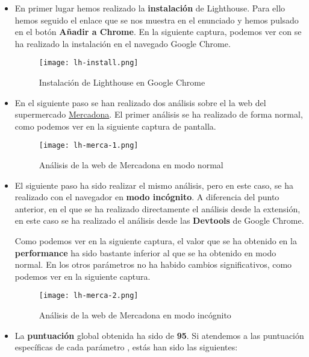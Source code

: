 \begin{itemize}
    \item En primer lugar hemos realizado la \textbf{instalación} de Lighthouse. Para ello hemos seguido el enlace que se nos muestra en el enunciado y hemos pulsado en el botón \textbf{Añadir a Chrome}. En la siguiente captura, podemos ver con se ha realizado la instalación en el navegado Google Chrome.

    \begin{figure}[H]
        \centering
        \texttt{[image: lh-install.png]}
        \caption{Instalación de Lighthouse en Google Chrome}
    \end{figure}

    \item En el siguiente paso se han realizado dos análisis sobre el la web del supermercado \href{https://www.mercadona.es/}{Mercadona}. El primer análisis se ha realizado de forma normal, como podemos ver en la siguiente captura de pantalla.

    \begin{figure}[H]
        \centering
        \texttt{[image: lh-merca-1.png]}
        \caption{Análisis de la web de Mercadona en modo normal}
    \end{figure}

    \item El siguiente paso ha sido realizar el mismo análisis, pero en este caso, se ha realizado con el navegador en \textbf{modo incógnito}. A diferencia del punto anterior, en el que se ha realizado directamente el análisis desde la extensión, en este caso se ha realizado el análisis desde las \textbf{Devtools} de Google Chrome.

    Como podemos ver en la siguiente captura, el valor que se ha obtenido en la \textbf{performance} ha sido bastante inferior al que se ha obtenido en modo normal. En los otros parámetros no ha habido cambios significativos, como podemos ver en la siguiente captura.

    \begin{figure}[H]
        \centering
        \texttt{[image: lh-merca-2.png]}
        \caption{Análisis de la web de Mercadona en modo incógnito}
    \end{figure}

    \item La \textbf{puntuación} global obtenida ha sido de \textbf{95}. Si atendemos a las puntuación específicas de cada parámetro , estás han sido las siguientes:


\end{itemize}

